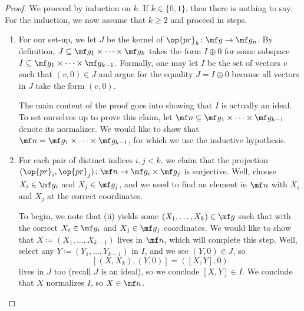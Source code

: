 \documentclass[../thesis.tex]{subfiles}
\begin{document}
\begin{proof}
	We proceed by induction on $k$. If $k\in\{0,1\}$, then there is nothing to say. For the induction, we now assume that $k\ge2$ and proceed in steps.
	\begin{enumerate}
		\item For our set-up, we let $J$ be the kernel of $\op{pr}_k\colon\mf g\to\mf g_n$. By definition, $J\subseteq\mf g_1\times\cdots\times\mf g_k$ takes the form $I\oplus0$ for some subspace $I\subseteq\mf g_1\times\cdots\times\mf g_{k-1}$. Formally, one may let $I$ be the set of vectors $v$ such that $(v,0)\in J$ and argue for the equality $J=I\oplus0$ because all vectors in $J$ take the form $(v,0)$.

		The main content of the proof goes into showing that $I$ is actually an ideal. To set ourselves up to prove this claim, let $\mf n\subseteq\mf g_1\times\cdots\times\mf g_{k-1}$ denote its normalizer. We would like to show that $\mf n=\mf g_1\times\cdots\times\mf g_{k-1}$, for which we use the inductive hypothesis.

		
		\item For each pair of distinct indices $i,j<k$, we claim that the projection $({\op{pr}_i},{\op{pr}_j})\colon\mf n\to\mf g_i\times\mf g_j$ is surjective. Well, choose $X_i\in\mf g_i$ and $X_j\in\mf g_j$, and we need to find an element in $\mf n$ with $X_i$ and $X_j$ at the correct coordinates.

		To begin, we note that (ii) yields some $(X_1,\ldots,X_k)\in\mf g$ such that with the correct $X_i\in\mf g_i$ and $X_j\in\mf g_j$ coordinates. We would like to show that $X\coloneqq(X_1,\ldots,X_{k-1})$ lives in $\mf n$, which will complete this step. Well, select any $Y\coloneqq(Y_1,\ldots,Y_{k-1})$ in $I$, and we see $(Y,0)\in J$, so
		\[[(X,X_k),(Y,0)]=([X,Y],0)\]
		lives in $J$ too (recall $J$ is an ideal), so we conclude $[X,Y]\in I$. We conclude that $X$ normalizes $I$, so $X\in\mf n$.


\end{enumerate}
\end{proof}
\end{document}
